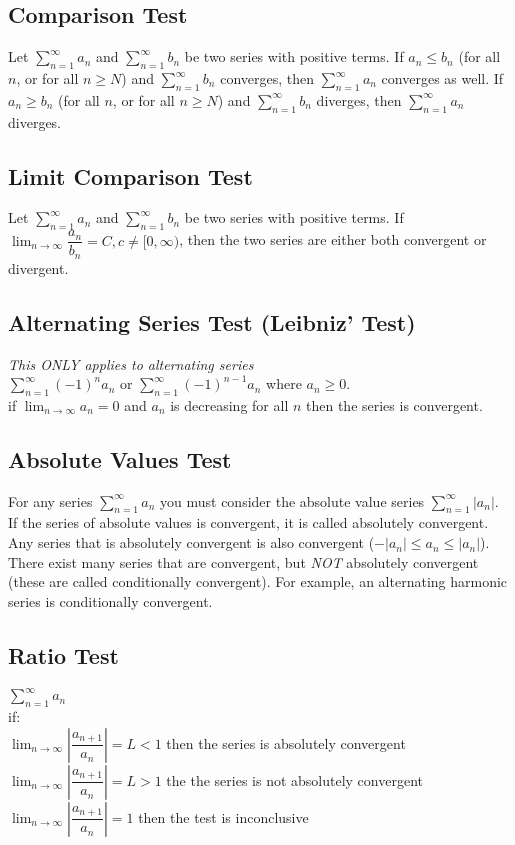 \documentclass{article}
\begin{document}
\subsection*{Comparison Test}
Let $\displaystyle \sum^\infty_{n=1}a_n$ and $\displaystyle \sum^\infty_{n=1}b_n$ be two series with positive terms. If $a_n\le b_n$ (for all $n$, or for all $n\ge N$) and $\displaystyle \sum^\infty_{n=1}b_n$ converges, then $\displaystyle \sum^\infty_{n=1}a_n$ converges as well. If $a_n\ge b_n$ (for all $n$, or for all $n\ge N$) and $\displaystyle \sum^\infty_{n=1}b_n$ diverges, then $\displaystyle \sum^\infty_{n=1}a_n$ diverges.
\subsection*{Limit Comparison Test}
Let $\displaystyle \sum^\infty_{n=1}a_n$ and $\displaystyle \sum^\infty_{n=1}b_n$ be two series with positive terms. If $\displaystyle \lim_{n\to\infty}\dfrac{a_n}{b_n}=C, c \not= [0,\infty)$, then the two series are either both convergent or divergent.
\subsection*{Alternating Series Test (Leibniz' Test)}
\textit{This ONLY applies to alternating series}\\
$\displaystyle \sum^\infty_{n=1}(-1)^na_n$ or $\displaystyle \sum^\infty_{n=1}(-1)^{n-1}a_n$ where $a_n\ge 0$.\\
if $\displaystyle \lim_{n\to\infty}a_n=0$ and $a_n$ is decreasing for all $n$ then the series is convergent.
\subsection*{Absolute Values Test}
For any series $\displaystyle \sum^\infty_{n=1}a_n$ you must consider the absolute value series $\displaystyle \sum^\infty_{n=1}|a_n|$. If the series of absolute values is convergent, it is called absolutely convergent. Any series that is absolutely convergent is also convergent ($-|a_n|\le a_n \le |a_n|$). There exist many series that are convergent, but \textit{NOT} absolutely convergent (these are called conditionally convergent). For example, an alternating harmonic series is conditionally convergent.
\subsection*{Ratio Test}
$\displaystyle \sum^\infty_{n=1}a_n$\\
if:\\
\indent $\displaystyle \lim_{n\to\infty}|\dfrac{a_{n+1} }{a_n}|=L<1$ then the series is absolutely convergent\\
\indent $\displaystyle \lim_{n\to\infty}|\dfrac{a_{n+1} }{a_n}|=L>1$ the the series is not absolutely convergent\\
\indent $\displaystyle \lim_{n\to\infty}|\dfrac{a_{n+1} }{a_n}|=1$ then the test is inconclusive\\
\end{document}
